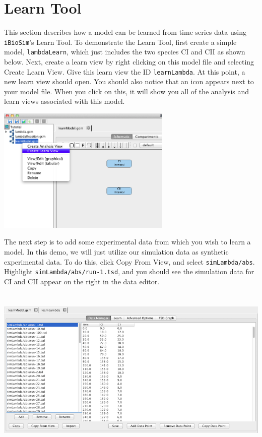 \documentclass[titlepage,11pt]{article}
\begin{document}
\section{Learn Tool}

This section describes how a model can be learned from time series data using {\tt iBioSim}'s Learn Tool.  To demonstrate the Learn Tool, first create a simple model, {\tt lambdaLearn}, which just includes the two species CI and CII as shown below.  Next, create a learn view by right clicking on this model file and selecting Create Learn View.  Give this learn view the ID {\tt learnLambda}.  At this point, a new learn view should open.  You should also notice that an icon appears next to your model file.  When you click on this, it will show you all of the analysis and learn views associated with this model.

\begin{center}
\includegraphics[height=60mm]{screenshots/createLearn}
\end{center}

The next step is to add some experimental data from which you wish to learn a model.  In this demo, we will just utilize our simulation data as synthetic experimental data.  To do this, click Copy From View, and select {\tt simLambda/abs}.  Highlight {\tt simLambda/abs/run-1.tsd}, and you should see the simulation data for CI and CII appear on the right in the data editor. 

\begin{center}
\includegraphics[height=80mm]{screenshots/dataManager}
\end{center}
\end{document}
